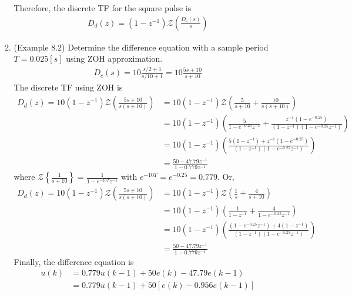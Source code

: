 \documentclass[landscape,14pt]{oblivoir}
\begin{document}
\begin{itemize}
\begin{enumerate}
		Therefore, the discrete TF for the square pulse is 
		\begin{align*}
			D_d(z) = (1-z^{-1}) \mathcal{Z} \left( \frac{D_c(s)}{s} \right)
		\end{align*}
%
\newpage
%
		\item (Example 8.2) Determine the difference equation with a sample period $T=0.025[s]$ using ZOH approximation. 
		\begin{align*}
			D_c(s) = 10 \frac{s/2+1}{s/10+1} = 10 \frac{5s+10}{s+10}
		\end{align*}
		The discrete TF using ZOH  is 
		\begin{align*}
			D_d(z) = 10 (1-z^{-1}) \mathcal{Z} \left( \frac{5s+10}{s(s+10)} \right)
			&= 10 (1-z^{-1}) \mathcal{Z} \left(  \frac{5}{s+10} + \frac{10}{s(s+10)} \right) \\
			&= 10 (1-z^{-1})  \left( \frac{5}{1-e^{-0.25}z^{-1}} + \frac{z^{-1}(1-e^{-0.25})}{(1-z^{-1})(1-e^{-0.25}z^{-1})} \right) \\
			&=  10 (1-z^{-1})  \left(  \frac{5(1-z^{-1}) + z^{-1}(1-e^{-0.25})}{(1-z^{-1})(1-e^{-0.25}z^{-1})} \right) \\
			&=   \frac{50 - 47.79z^{-1}}{1 - 0.779z^{-1}} 
		\end{align*}
	where $\mathcal{Z} \left\{ \frac{1}{s+10} \right\} = \frac{1}{1-e^{-10T}z^{-1}}$ with  $e^{-10T} = e^{-0.25}=0.779$. Or, 
		\begin{align*}
			D_d(z) = 10 (1-z^{-1}) \mathcal{Z} \left( \frac{5s+10}{s(s+10)} \right)
			&= 10 (1-z^{-1}) \mathcal{Z} \left(  \frac{1}{s} + \frac{4}{s+10} \right) \\
			&= 10 (1-z^{-1})  \left( \frac{1}{1-z^{-1}} + \frac{4}{1-e^{-0.25}z^{-1}} \right) \\
			&=  10 (1-z^{-1})  \left(  \frac{(1-e^{-0.25}z^{-1})+ 4(1-z^{-1})}{(1-z^{-1})(1-e^{-0.25}z^{-1})} \right) \\
			&=   \frac{50 - 47.79z^{-1}}{1 - 0.779z^{-1}} 
		\end{align*}
		Finally, the difference equation is 
		\begin{align*}
			u(k) &= 0.779 u(k-1) + 50 e(k) - 47.79 e(k-1) \\
			&= 0.779 u(k-1) + 50 [ e(k) -  0.956 e(k-1) ]
		\end{align*}
		\begin{figure}[h]

\end{figure}
\end{enumerate}
\end{itemize}
\end{document}

